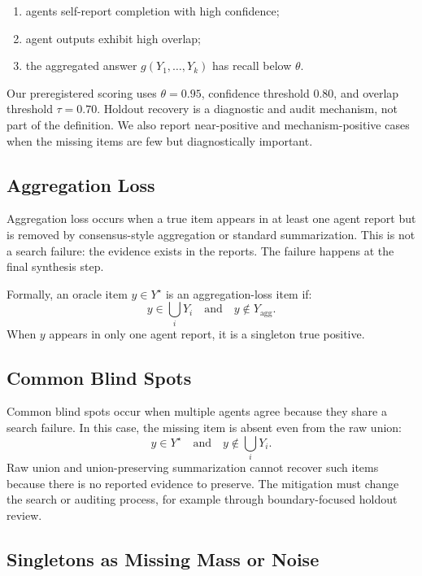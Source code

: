 \documentclass[letterpaper]{article}
\begin{document}
\begin{enumerate}
    \item agents self-report completion with high confidence;
    \item agent outputs exhibit high overlap;
    \item the aggregated answer $g(Y_1,\ldots,Y_k)$ has recall below $\theta$.
\end{enumerate}

Our preregistered scoring uses $\theta=0.95$, confidence threshold $0.80$, and
overlap threshold $\tau=0.70$. Holdout recovery is a diagnostic and audit
mechanism, not part of the definition. We also report near-positive and
mechanism-positive cases when the missing items are few but diagnostically
important.

\subsection{Aggregation Loss}

Aggregation loss occurs when a true item appears in at least one agent report
but is removed by consensus-style aggregation or standard summarization. This is
not a search failure: the evidence exists in the reports. The failure happens at
the final synthesis step.

Formally, an oracle item $y \in Y^\star$ is an aggregation-loss item if:
\begin{equation}
y \in \bigcup_i Y_i \quad \text{and} \quad y \notin Y_{\text{agg}}.
\end{equation}
When $y$ appears in only one agent report, it is a singleton true positive.

\subsection{Common Blind Spots}

Common blind spots occur when multiple agents agree because they share a search
failure. In this case, the missing item is absent even from the raw union:
\begin{equation}
y \in Y^\star \quad \text{and} \quad y \notin \bigcup_i Y_i.
\end{equation}
Raw union and union-preserving summarization cannot recover such items because
there is no reported evidence to preserve. The mitigation must change the search
or auditing process, for example through boundary-focused holdout review.

\subsection{Singletons as Missing Mass or Noise}
\end{document}

